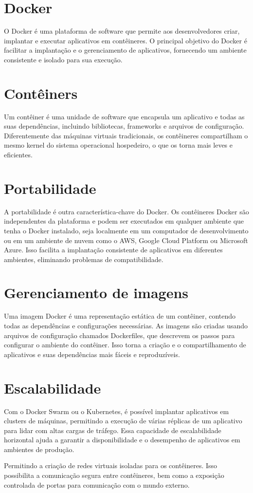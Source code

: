\section{Docker}

O Docker é uma plataforma de software que permite aos desenvolvedores criar, implantar e executar aplicativos em contêineres. O principal objetivo do Docker é facilitar a implantação e o gerenciamento de aplicativos, fornecendo um ambiente consistente e isolado para sua execução.

\section{Contêiners}
 
 Um contêiner é uma unidade de software que encapsula um aplicativo e todas as suas dependências, incluindo bibliotecas, frameworks e arquivos de configuração. Diferentemente das máquinas virtuais tradicionais, os contêineres compartilham o mesmo kernel do sistema operacional hospedeiro, o que os torna mais leves e eficientes.

\section{Portabilidade}
A portabilidade é outra característica-chave do Docker. Os contêineres Docker são independentes da plataforma e podem ser executados em qualquer ambiente que tenha o Docker instalado, seja localmente em um computador de desenvolvimento ou em um ambiente de nuvem como o AWS, Google Cloud Platform ou Microsoft Azure. Isso facilita a implantação consistente de aplicativos em diferentes ambientes, eliminando problemas de compatibilidade.

\section{Gerenciamento de imagens}

Uma imagem Docker é uma representação estática de um contêiner, contendo todas as dependências e configurações necessárias. As imagens são criadas usando arquivos de configuração chamados Dockerfiles, que descrevem os passos para configurar o ambiente do contêiner. Isso torna a criação e o compartilhamento de aplicativos e suas dependências mais fáceis e reproduzíveis.

\section{Escalabilidade}

Com o Docker Swarm ou o Kubernetes, é possível implantar aplicativos em clusters de máquinas, permitindo a execução de várias réplicas de um aplicativo para lidar com altas cargas de tráfego. Essa capacidade de escalabilidade horizontal ajuda a garantir a disponibilidade e o desempenho de aplicativos em ambientes de produção.

Permitindo a criação de redes virtuais isoladas para os contêineres. Isso possibilita a comunicação segura entre contêineres, bem como a exposição controlada de portas para comunicação com o mundo externo.
